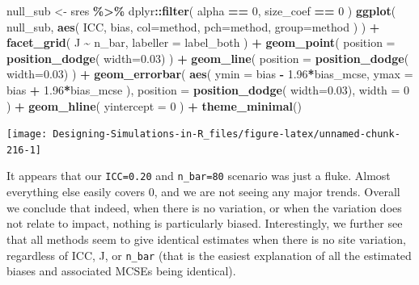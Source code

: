 \documentclass[
]{book}
\newenvironment{Shaded}{\begin{snugshade}}{\end{snugshade}}
\newcommand{\AttributeTok}[1]{\textcolor[rgb]{0.13,0.29,0.53}{#1}}
\newcommand{\DecValTok}[1]{\textcolor[rgb]{0.00,0.00,0.81}{#1}}
\newcommand{\FloatTok}[1]{\textcolor[rgb]{0.00,0.00,0.81}{#1}}
\newcommand{\FunctionTok}[1]{\textcolor[rgb]{0.13,0.29,0.53}{\textbf{#1}}}
\newcommand{\NormalTok}[1]{#1}
\newcommand{\OtherTok}[1]{\textcolor[rgb]{0.56,0.35,0.01}{#1}}
\newcommand{\SpecialCharTok}[1]{\textcolor[rgb]{0.81,0.36,0.00}{\textbf{#1}}}
\begin{document}
\begin{Shaded}
\begin{Highlighting}[]
\NormalTok{null\_sub }\OtherTok{\textless{}{-}}\NormalTok{ sres }\SpecialCharTok{\%\textgreater{}\%}
\NormalTok{  dplyr}\SpecialCharTok{::}\FunctionTok{filter}\NormalTok{( alpha }\SpecialCharTok{==} \DecValTok{0}\NormalTok{, size\_coef }\SpecialCharTok{==} \DecValTok{0}\NormalTok{ )}
\FunctionTok{ggplot}\NormalTok{( null\_sub, }\FunctionTok{aes}\NormalTok{( ICC, bias, }
                       \AttributeTok{col=}\NormalTok{method, }\AttributeTok{pch=}\NormalTok{method, }\AttributeTok{group=}\NormalTok{method ) ) }\SpecialCharTok{+}
  \FunctionTok{facet\_grid}\NormalTok{( J }\SpecialCharTok{\textasciitilde{}}\NormalTok{ n\_bar, }\AttributeTok{labeller =}\NormalTok{ label\_both ) }\SpecialCharTok{+}
  \FunctionTok{geom\_point}\NormalTok{( }\AttributeTok{position =} \FunctionTok{position\_dodge}\NormalTok{( }\AttributeTok{width=}\FloatTok{0.03}\NormalTok{) ) }\SpecialCharTok{+}
  \FunctionTok{geom\_line}\NormalTok{( }\AttributeTok{position =} \FunctionTok{position\_dodge}\NormalTok{( }\AttributeTok{width=}\FloatTok{0.03}\NormalTok{) ) }\SpecialCharTok{+}
  \FunctionTok{geom\_errorbar}\NormalTok{( }\FunctionTok{aes}\NormalTok{( }\AttributeTok{ymin =}\NormalTok{ bias }\SpecialCharTok{{-}} \FloatTok{1.96}\SpecialCharTok{*}\NormalTok{bias\_mcse,}
                      \AttributeTok{ymax =}\NormalTok{ bias }\SpecialCharTok{+} \FloatTok{1.96}\SpecialCharTok{*}\NormalTok{bias\_mcse ),}
                 \AttributeTok{position =} \FunctionTok{position\_dodge}\NormalTok{( }\AttributeTok{width=}\FloatTok{0.03}\NormalTok{),}
                 \AttributeTok{width =} \DecValTok{0}\NormalTok{ ) }\SpecialCharTok{+}
  \FunctionTok{geom\_hline}\NormalTok{( }\AttributeTok{yintercept =} \DecValTok{0}\NormalTok{ ) }\SpecialCharTok{+}
  \FunctionTok{theme\_minimal}\NormalTok{() }
\end{Highlighting}
\end{Shaded}

\begin{center}\texttt{[image: Designing-Simulations-in-R\_files/figure-latex/unnamed-chunk-216-1]} \end{center}

It appears that our \texttt{ICC=0.20} and \texttt{n\_bar=80} scenario was just a fluke.
Almost everything else easily covers 0, and we are not seeing any major trends.
Overall we conclude that indeed, when there is no variation, or when the variation does not relate to impact, nothing is particularly biased.
Interestingly, we further see that all methods seem to give identical estimates when there is no site variation, regardless of ICC, J, or \texttt{n\_bar} (that is the easiest explanation of all the estimated biases and associated MCSEs being identical).
\end{document}
